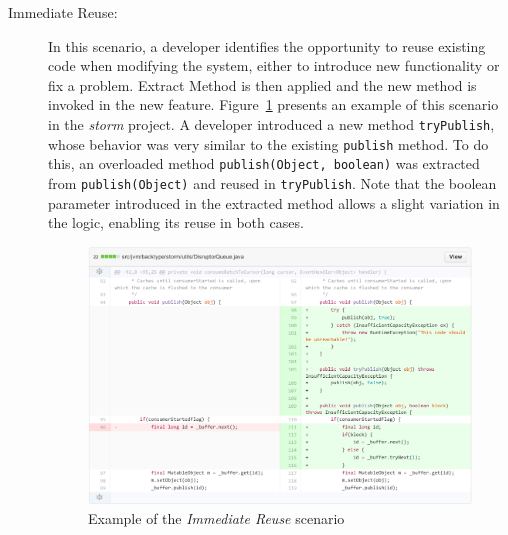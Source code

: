 \begin{description}
\item[Immediate Reuse:] In this scenario, a developer identifies the opportunity to reuse existing code when modifying the system, either to introduce new functionality or fix a problem. Extract Method is then applied and the new method is invoked in the new feature.
Figure~\ref{iexinit} presents an example of this scenario in the \textit{storm} project. A developer introduced a new method \texttt{tryPublish}, whose behavior was very similar to the existing \texttt{publish} method. To do this, an overloaded method \texttt{publish(Object, boolean)} was extracted from \texttt{publish(Object)} and reused in \texttt{tryPublish}. Note that the boolean parameter introduced in the extracted method allows a slight variation in the logic, enabling its reuse in both cases.


\begin{figure}[htbp]\centering
\includegraphics[width=1\textwidth]{img/ch5/init.pdf}
\caption{Example of the \textit{Immediate Reuse} scenario}
\label{iexinit}
\end{figure}



\end{description}
